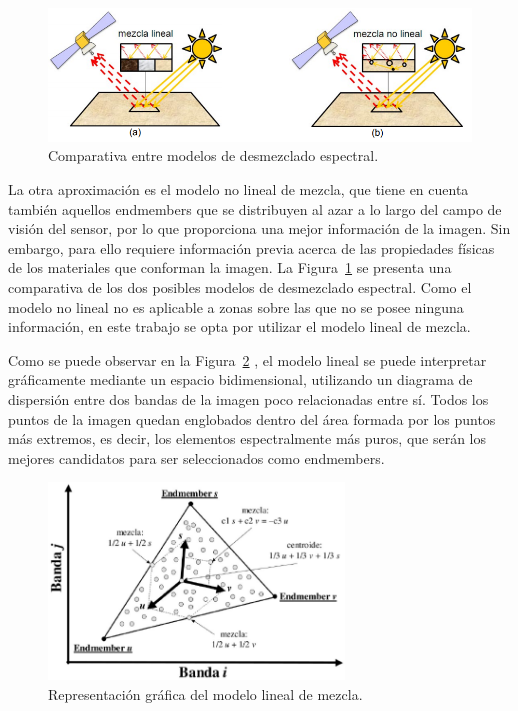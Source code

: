 \begin{figure}
  \centering
    \includegraphics[width=\textwidth]{Imagenes/ComparativaModelosDesmezclado.png}
  \caption{Comparativa entre modelos de desmezclado espectral.}
  \label{fig:comparativa modelos de desmezclado espectral}
\end{figure}

La otra aproximación es el modelo no lineal de mezcla, que tiene en cuenta también aquellos endmembers que se distribuyen al azar a lo largo del campo de visión del sensor, por lo que proporciona una mejor información de la imagen. Sin embargo, para ello requiere información previa acerca de las propiedades físicas de los materiales que conforman la imagen. La Figura~\ref{fig:comparativa modelos de desmezclado espectral} \cite{biblio:TFG_Esquembri} se presenta una comparativa de los dos posibles modelos de desmezclado espectral. Como el modelo no lineal no es aplicable a zonas sobre las que no se posee ninguna información, en este trabajo se opta por utilizar el modelo lineal de mezcla.


Como se puede observar en la Figura~\ref{fig:representacion grafica del modelo lineal de mezcla} \cite{biblio:TFM_Pablo_VCA}, el modelo lineal se puede interpretar gráficamente mediante un espacio bidimensional, utilizando un diagrama de dispersión entre dos bandas de la imagen poco relacionadas entre sí. Todos los puntos de la imagen quedan englobados dentro del área formada por los puntos más extremos, es decir, los elementos espectralmente más puros, que serán los mejores candidatos para ser seleccionados como endmembers.

\begin{figure}
  \centering
    \includegraphics[width=0.7\textwidth]{Imagenes/GraficoModeloLinealDeMezcla.png}
  \caption{Representación gráfica del modelo lineal de mezcla.}
  \label{fig:representacion grafica del modelo lineal de mezcla}
\end{figure}

